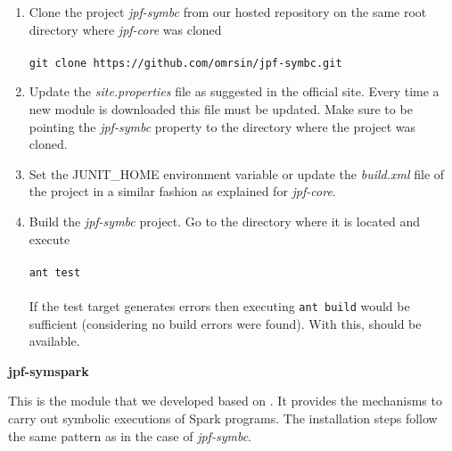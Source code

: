 \begin{enumerate}
	\item Clone the project \textit{jpf-symbc} from our hosted repository on the same root directory where \textit{jpf-core} was cloned \\ \\
		\lstinline[]|git clone https://github.com/omrsin/jpf-symbc.git|
	\item Update the \textit{site.properties} file as suggested in the official \jpf{} site. Every time a new module is downloaded this file must be updated. Make sure to be pointing the \textit{jpf-symbc} property to the directory where the project was cloned.
	\item Set the JUNIT\_HOME environment variable or update the \textit{build.xml} file of the project in a similar fashion as explained for \textit{jpf-core}.
	\item Build the \textit{jpf-symbc} project. Go to the directory where it is located and execute \\ \\		
		\lstinline[]|ant test| \\ \\
	If the test target generates errors then executing \lstinline[]|ant build| would be sufficient (considering no build errors were found). With this, \spf{} should be available.
\end{enumerate}

\textbf{jpf-symspark}

This is the module that we developed based on \spf{}. It provides the mechanisms to carry out symbolic executions of Spark programs. The installation steps follow the same pattern as in the case of \textit{jpf-symbc}.

